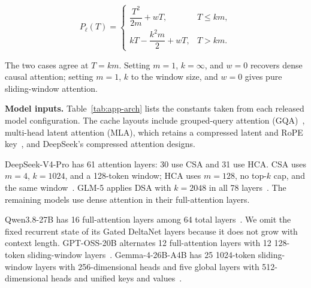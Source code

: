\[
P_\ell(T)
=
\begin{cases}
\dfrac{T^2}{2m}+wT,
& T\leq km,
\\[2ex]
kT-\dfrac{k^2m}{2}+wT,
& T>km.
\end{cases}
\]

The two cases agree at \(T=km\). Setting \(m=1\), \(k=\infty\), and \(w=0\)
recovers dense causal attention; setting \(m=1\), \(k\) to the window size,
and \(w=0\) gives pure sliding-window attention.

\noindent\textbf{Model inputs.}
Table~\ref{tab:app-arch} lists the constants taken from each released model
configuration. The cache layouts include grouped-query attention
(GQA)~\cite{gqa}, multi-head latent attention (MLA), which retains
a compressed latent and RoPE key~\cite{deepseekv2}, and DeepSeek's compressed
attention designs.

DeepSeek-V4-Pro has 61 attention layers: 30 use CSA and 31 use HCA. CSA uses
\(m=4\), \(k=1024\), and a 128-token window; HCA uses \(m=128\), no top-\(k\)
cap, and the same window~\cite{deepseekv4}. GLM-5 applies DSA with
\(k=2048\) in all 78 layers~\cite{glm5}. The remaining models use dense
attention in their full-attention layers.

Qwen3.8-27B has 16 full-attention layers among 64 total
layers~\cite{qwen38}. We omit the fixed recurrent state of its Gated DeltaNet
layers because it does not grow with context length. GPT-OSS-20B alternates 12
full-attention layers with 12 128-token sliding-window layers~\cite{gptoss20}.
Gemma-4-26B-A4B has 25 1024-token sliding-window layers with 256-dimensional
heads and five global layers with 512-dimensional heads and unified keys and
values~\cite{gemma4}.

\begin{table}[t]
\centering
{}
\caption{Model constants used by the analysis, sorted by KV size.
\(A\) is the active parameter count, \(L\) is the number of represented
attention layers, and \(\eta\) is the BF16 KV size per token at 100k tokens.}
\label{tab:app-arch}
\end{table}

